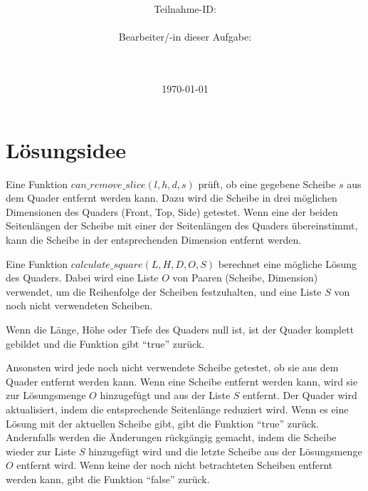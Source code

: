 \documentclass[a4paper,10pt,ngerman]{scrartcl}
\title{\textbf{\Huge\Aufgabe}}
\author{\LARGE Teilnahme-ID: \LARGE \TeilnahmeId \\\\
\LARGE Bearbeiter/-in dieser Aufgabe: \\
\LARGE \Name\\\\}
\date{\LARGE\today}
\begin{document}
    \maketitle
    \tableofcontents
    \vspace{0.5cm}
    \newpage


    \section{Lösungsidee}\label{sec:losungsidee}

    Eine Funktion $can\_remove\_slice(l, h, d, s)$ prüft, ob eine gegebene Scheibe $s$ aus dem Quader entfernt werden kann.
    Dazu wird die Scheibe in drei möglichen Dimensionen des Quaders (Front, Top, Side) getestet.
    Wenn eine der beiden Seitenlängen der Scheibe mit einer der Seitenlängen des Quaders übereinstimmt,
    kann die Scheibe in der entsprechenden Dimension entfernt werden.

    Eine Funktion $calculate\_square(L, H, D, O, S)$ berechnet eine mögliche Lösung des Quaders.
    Dabei wird eine Liste $O$ von Paaren (Scheibe, Dimension) verwendet, um die Reihenfolge der Scheiben festzuhalten,
    und eine Liste $S$ von noch nicht verwendeten Scheiben.

    Wenn die Länge, Höhe oder Tiefe des Quaders null ist, ist der Quader komplett gebildet und die Funktion gibt ``true'' zurück.

    Ansonsten wird jede noch nicht verwendete Scheibe getestet, ob sie aus dem Quader entfernt werden kann.
    Wenn eine Scheibe entfernt werden kann, wird sie zur Lösungsmenge $O$ hinzugefügt und aus der Liste $S$ entfernt.
    Der Quader wird aktualisiert, indem die entsprechende Seitenlänge reduziert wird.
    Wenn es eine Lösung mit der aktuellen Scheibe gibt, gibt die Funktion ``true'' zurück.
    Andernfalls werden die Änderungen rückgängig gemacht, indem die Scheibe wieder zur Liste $S$ hinzugefügt wird
    und die letzte Scheibe aus der Lösungsmenge $O$ entfernt wird.
    Wenn keine der noch nicht betrachteten Scheiben entfernt werden kann, gibt die Funktion ``false'' zurück.
\end{document}
